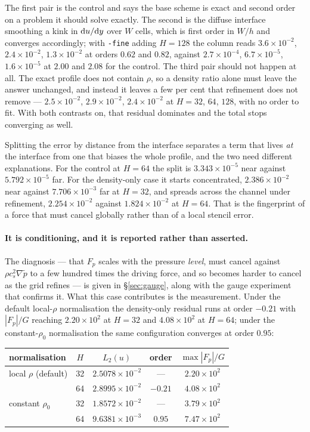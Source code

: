 \documentclass[11pt,a4paper]{article}
\newcommand{\code}[1]{\texttt{\small #1}}
\newcommand{\cs}{c_s}
\newcommand{\e}[1]{\times 10^{#1}}
\begin{document}
\noindent The first pair is the control and says the base scheme is exact and
second order on a problem it should solve exactly. The second is the diffuse
interface smoothing a kink in ${\rm d}u/{\rm d}y$ over $W$ cells, which is first
order in $W/h$ and converges accordingly; with \code{-fine} adding $H=128$ the
column reads $3.6\e{-2}$, $2.4\e{-2}$, $1.3\e{-2}$ at orders $0.62$ and $0.82$,
against $2.7\e{-4}$, $6.7\e{-5}$, $1.6\e{-5}$ at $2.00$ and $2.08$ for the
control. The third pair should not happen at all. The exact profile does not
contain $\rho$, so a density ratio alone must leave the answer unchanged, and
instead it leaves a few per cent that refinement does not remove --- $2.5\e{-2}$,
$2.9\e{-2}$, $2.4\e{-2}$ at $H=32$, $64$, $128$, with no order to fit. With both
contrasts on, that residual dominates and the total stops converging as well.

Splitting the error by distance from the interface separates a term that lives
\emph{at} the interface from one that biases the whole profile, and the two need
different explanations. For the control at $H=64$ the split is
$3.343\e{-5}$ near against $5.792\e{-5}$ far. For the density-only case it starts
concentrated, $2.386\e{-2}$ near against $7.706\e{-3}$ far at $H=32$, and spreads
across the channel under refinement, $2.254\e{-2}$ against $1.824\e{-2}$ at
$H=64$. That is the fingerprint of a force that must cancel globally rather than
of a local stencil error.

\paragraph{It is conditioning, and it is reported rather than asserted.} The
diagnosis --- that $F_p$ scales with the pressure \emph{level}, must cancel
against $\rho\cs^2\nabla\tilde{p}$ to a few hundred times the driving force, and
so becomes harder to cancel as the grid refines --- is given in
\S\ref{sec:gauge}, along with the gauge experiment that confirms it. What this
case contributes is the measurement. Under the default local-$\rho$
normalisation the density-only residual runs at order $-0.21$ with $|F_p|/G$
reaching $2.20\e{2}$ at $H=32$ and $4.08\e{2}$ at $H=64$; under the
constant-$\rho_0$ normalisation the same configuration converges at order $0.95$:

\begin{center}\small
\begin{tabular}{lcccc}
\toprule
normalisation & $H$ & $L_2(u)$ & order & $\max|F_p|/G$ \\
\midrule
local $\rho$ (default) & 32 & $2.5078\e{-2}$ & ---     & $2.20\e{2}$ \\
                       & 64 & $2.8995\e{-2}$ & $-0.21$ & $4.08\e{2}$ \\
constant $\rho_0$      & 32 & $1.8572\e{-2}$ & ---     & $3.79\e{2}$ \\
                       & 64 & $9.6381\e{-3}$ & $0.95$  & $7.47\e{2}$ \\
\bottomrule
\end{tabular}
\end{center}
\end{document}
